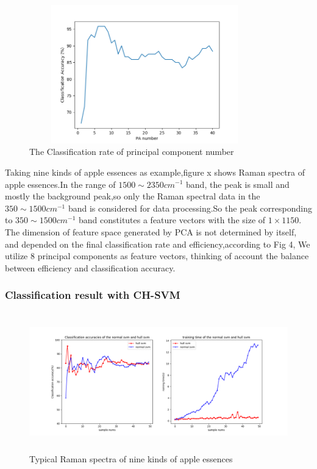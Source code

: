 \documentclass[a4paper]{article}
\begin{document}
    \begin{figure}[h]
  \centering
  \includegraphics[width=10cm,height=6cm]{Figure_3}
  \caption{ The Classification rate of principal component number }
\end{figure}
Taking nine kinds of apple essences as example,figure x shows Raman spectra of apple essences.In the range of $1500 \sim  2350 cm^{-1}$ band, the peak is small and mostly the background peak,so only the Raman spectral data in the $350 \sim 1500 cm^{-1}$ band is considered for data processing.So the peak corresponding to $ 350 \sim 1500 cm^{-1}$ band constitutes a feature vectors with the size of $ 1\times 1150 $.
The dimension of feature space generated by PCA is not determined by itself, and depended on the final classification rate and efficiency,according to Fig 4, We utilize 8 principal components as feature vectors, thinking of account the balance between efficiency and classification accuracy.

    \subsubsection{Classification result with CH-SVM}

\begin{figure}[h]
  \centering
  \includegraphics[width=15cm,height=6cm]{Figure_2}
  \caption{Typical Raman spectra of nine kinds of apple essences}
\end{figure}
\end{document}
